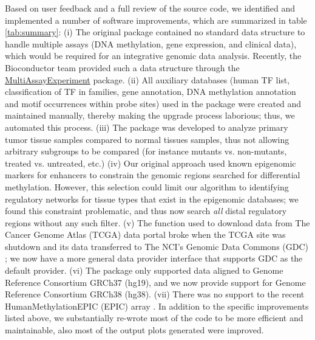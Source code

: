 Based on user feedback and a full review of the source code, we identified and implemented a number of software improvements, which are summarized in table \ref{tab:summary}: (i) The original package contained no standard data structure to handle multiple assays (DNA methylation, gene expression, and clinical data), which would be required for an integrative genomic data analysis. Recently, the Bioconductor team provided such a data structure through the \href{http://bioconductor.org/packages/MultiAssayExperiment/}{MultiAssayExperiment} package. (ii) All auxiliary databases (human TF list, classification of TF in families, gene annotation, DNA methylation annotation and motif occurrences within probe sites) used in the package were created and maintained manually, thereby making the upgrade process laborious; thus, we automated this process. (iii) The package was developed to analyze primary tumor tissue samples compared to normal tissues samples, thus not allowing arbitrary subgroups to be compared (for instance mutants vs. non-mutants, treated vs. untreated, etc.) (iv) Our original approach used known epigenomic markers for enhancers to constrain the genomic regions searched for differential methylation. However, this selection could limit our algorithm to identifying regulatory networks for tissue types that exist in the epigenomic databases; we found this constraint problematic, and thus now search \textit{all} distal regulatory regions without any such filter. (v) The function used to download data from The Cancer Genome Atlas (TCGA) data portal \cite{tomczak2015cancer} broke when the TCGA site was shutdown and its data transferred to The NCI's Genomic Data Commons (GDC) \cite{grossman2016toward}; we now have a more general data provider interface that supports GDC as the default provider. (vi) The package only supported data aligned to Genome Reference Consortium GRCh37 (hg19), and we now provide support for Genome Reference Consortium GRCh38 (hg38). (vii) There was no support to the recent HumanMethylationEPIC (EPIC) array \cite{epic}. In addition to the specific improvements listed above, we substantially re-wrote most of the code to be more efficient and maintainable,  also most of the output plots generated were improved.

